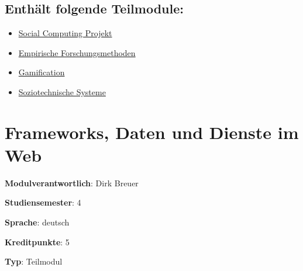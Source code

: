 \hypertarget{enthuxe4lt-folgende-teilmodulepathlabelmi-2017modulbeschreibungen-bachelorba_vertiefung_socialcomputing}{%
\section*{Enthält folgende
Teilmodule:\label{/mi-2017/modulbeschreibungen-bachelor/BA_Vertiefung_SocialComputing}}\label{enthuxe4lt-folgende-teilmodulepathlabelmi-2017modulbeschreibungen-bachelorba_vertiefung_socialcomputing}}

\begin{itemize}
\tightlist
\item
  \hyperref[/mi-2017/modulbeschreibungen-bachelor/BA_SC_Projekt]{Social Computing Projekt}
\item
  \hyperref[/mi-2017/modulbeschreibungen-bachelor/BA_SC_empirische-forschungsmethoden]{Empirische Forschungsmethoden}
\item
  \hyperref[/mi-2017/modulbeschreibungen-bachelor/BA_SC_gamification]{Gamification}
\item
  \hyperref[/mi-2017/modulbeschreibungen-bachelor/BA_SC_soziotechnische-systeme]{Soziotechnische Systeme}
\end{itemize}

\hypertarget{frameworks-daten-und-dienste-im-webpathlabelmi-2017modulbeschreibungen-bachelorba_wd_frameworks-daten-und-dienste}{%
\chapter{Frameworks, Daten und Dienste im
Web\label{/mi-2017/modulbeschreibungen-bachelor/BA_WD_Frameworks-daten-und-dienste}}\label{frameworks-daten-und-dienste-im-webpathlabelmi-2017modulbeschreibungen-bachelorba_wd_frameworks-daten-und-dienste}}

\begin{modulHead}
\textbf{Modulverantwortlich}: Dirk
Breuer
\end{modulHead}
\begin{modulHead}
\textbf{Studiensemester}:
4
\end{modulHead}
\begin{modulHead}
\textbf{Sprache}:
deutsch
\end{modulHead}
\begin{modulHead}
\textbf{Kreditpunkte}:
5
\end{modulHead}
\begin{modulHead}
\textbf{Typ}:
Teilmodul
\end{modulHead}


